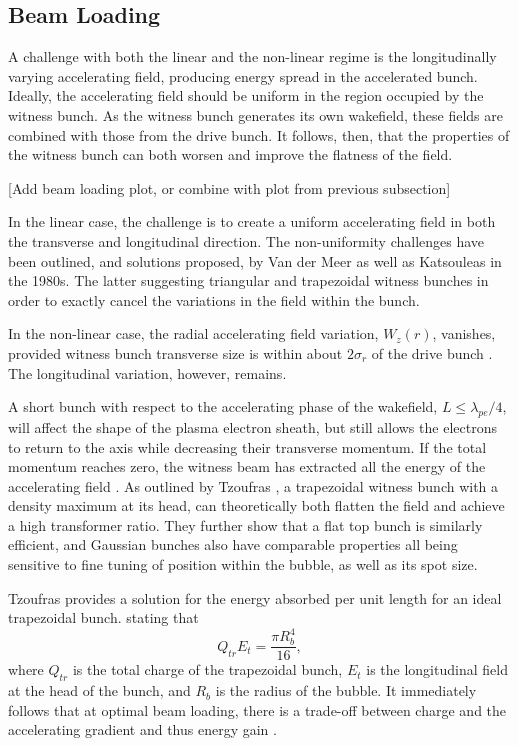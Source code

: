 \subsection{Beam Loading}
\label{Int:BPI:BLoad}

A challenge with both the linear and the non-linear regime is the longitudinally varying accelerating field, producing energy spread in the accelerated bunch. Ideally, the accelerating field should be uniform in the region occupied by the witness bunch. As the witness bunch generates its own wakefield, these fields are combined with those from the drive bunch. It follows, then, that the properties of the witness bunch can both worsen and improve the flatness of the field.

[Add beam loading plot, or combine with plot from previous subsection]

In the linear case, the challenge is to create a uniform accelerating field in both the transverse and longitudinal direction. The non-uniformity challenges have been outlined, and solutions proposed, by Van der Meer \cite{van_der_meer:1985} as well as Katsouleas \etal \cite{katsouleas:1987} in the 1980s. The latter suggesting triangular and trapezoidal witness bunches in order to exactly cancel the variations in the field within the bunch.

In the non-linear case, the radial accelerating field variation, $W_{z}(r)$, vanishes, provided witness bunch transverse size is within about $2\sigma_{r}$ of the drive bunch \cite{rosenzweig:1991}. The longitudinal variation, however, remains.

A short bunch with respect to the accelerating phase of the wakefield, $L \leq \lambda_{pe}/4$, will affect the shape of the plasma electron sheath, but still allows the electrons to return to the axis while decreasing their transverse momentum. If the total momentum reaches zero, the witness beam has extracted all the energy of the accelerating field \cite{lu:2006a,lu:2006}. As outlined by Tzoufras \etal \cite{tzoufras:2009}, a trapezoidal witness bunch with a density maximum at its head, can theoretically both flatten the field and achieve a high transformer ratio. They further show that a flat top bunch is similarly efficient, and Gaussian bunches also have comparable properties \dash all being sensitive to fine tuning of position within the bubble, as well as its spot size.

Tzoufras \etal provides a solution for the energy absorbed per unit length for an ideal trapezoidal bunch. stating that
\begin{equation}
    Q_{tr}E_{t} = \frac{\pi R_{b}^{4}}{16}, \label{EQ:Trapez}
\end{equation}
where $Q_{tr}$ is the total charge of the trapezoidal bunch, $E_{t}$ is the longitudinal field at the head of the bunch, and $R_{b}$ is the radius of the bubble. It immediately follows that at optimal beam loading, there is a trade-off between charge and the accelerating gradient and thus energy gain \cite{tzoufras:2009}.

